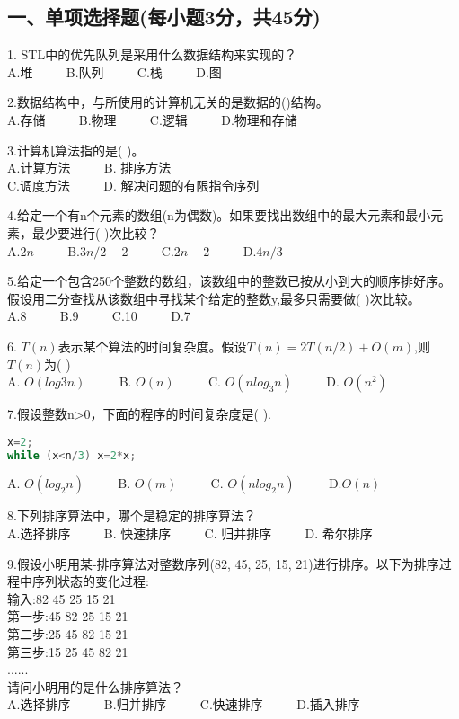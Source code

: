 
\subsection{一、单项选择题(每小题3分，共45分)}
1. STL中的优先队列是采用什么数据结构来实现的？ \\
A.堆  $\qquad$ B.队列 $\qquad$ C.栈 $\qquad$ D.图

2.数据结构中，与所使用的计算机无关的是数据的()结构。 \\
A.存储 $\qquad$ B.物理 $\qquad$ C.逻辑 $\qquad$ D.物理和存储

3.计算机算法指的是( )。 \\
A.计算方法 $\qquad$ B. 排序方法 \\
C.调度方法 $\qquad$ D. 解决问题的有限指令序列

4.给定一个有n个元素的数组(n为偶数)。如果要找出数组中的最大元素和最小元素，最少要进行( )次比较？ \\
A.$2n$ $\qquad$ B.$3n/2-2$ $\qquad$ C.$2n-2$ $\qquad$ D.$4n/3$

5.给定一个包含250个整数的数组，该数组中的整数已按从小到大的顺序排好序。假设用二分查找从该数组中寻找某个给定的整数y,最多只需要做( )次比较。 \\
A.8 $\qquad$ B.9 $\qquad$ C.10 $\qquad$ D.7

6. $T(n)$表示某个算法的时间复杂度。假设$T(n)=2T(n/2)+O(m)$,则$T(n)$为( ) \\
A. $O(log3n)$ $\qquad$ B. $O(n)$ $\qquad$ C. $O(nlog_3n)$ $\qquad$ D. $O(n^2)$

7.假设整数n>0，下面的程序的时间复杂度是( ). \\
\begin{lstlisting}[language=cpp]
x=2;
while (x<n/3) x=2*x;
\end{lstlisting}
A. $O(log_2n)$ $\qquad$ B. $O(m)$ $\qquad$ C. $O(nlog_2n)$ $\qquad$ D.$O(n)$

8.下列排序算法中，哪个是稳定的排序算法？ \\
A.选择排序 $\qquad$ B. 快速排序 $\qquad$ C. 归并排序 $\qquad$ D. 希尔排序

9.假设小明用某-排序算法对整数序列(82, 45, 25, 15, 21)进行排序。以下为排序过程中序列状态的变化过程: \\
输入:82 45 25 15 21 \\
第一步:45 82 25 15 21 \\
第二步:25 45 82 15 21 \\
第三步:15 25 45 82 21 \\
...... \\
请问小明用的是什么排序算法？ \\
A.选择排序 $\qquad$ B.归并排序 $\qquad$ C.快速排序 $\qquad$ D.插入排序

